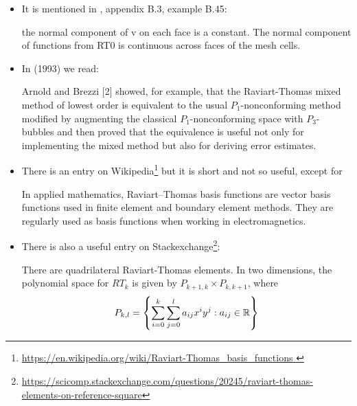 \begin{itemize}
\item 
It is mentioned in \textcite{john16}, appendix B.3, example B.45: 
\begin{displayquote}
{\color{darkgray}
the normal component of v 
on each face is a constant. The normal component of functions from RT0 is
continuous across faces of the mesh cells.
}
\end{displayquote}


\item
In \textcite{chen93a} (1993) we read:
\begin{displayquote}
{\color{darkgray}
Arnold and Brezzi [2] showed, for
example, that the Raviart-Thomas mixed method of lowest order is
equivalent to the usual $P_1$-nonconforming method modified by augmenting
the classical $P_1$-nonconforming space with $P_3$-bubbles and then proved that
the equivalence is useful not only for implementing the mixed method but
also for deriving error estimates.
}
\end{displayquote}


\item
There is an entry on Wikipedia\footnote{\url{
https://en.wikipedia.org/wiki/Raviart-Thomas_basis_functions
}} but it is short and not so useful, except for
\begin{displayquote}
{\color{darkgray}
In applied mathematics, Raviart–Thomas basis functions are vector basis functions used 
in finite element and boundary element methods. They are regularly used as basis 
functions when working in electromagnetics. 
}
\end{displayquote}

\item
There is also a useful entry on Stackexchange\footnote{\url{
https://scicomp.stackexchange.com/questions/20245/raviart-thomas-elements-on-reference-square}}:
\begin{displayquote}
{\color{darkgray}
There are quadrilateral Raviart-Thomas elements. 
In two dimensions, the polynomial space for $RT_k$ is given by 
$P_{k+1,k} \times P_{k,k+1}$, where
\[
P_{k,l}=\left\{ \sum_{i=0}^{k} \sum_{j=0}^{l} a_{ij} x^i y^j: a_{ij}\in {\mathbb{R}}  \right\}
\]

}
\end{displayquote}
\end{itemize}
